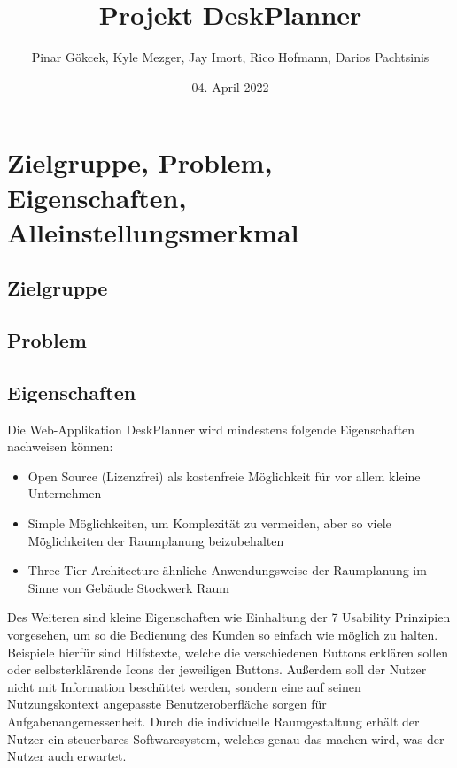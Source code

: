 \documentclass{article}
\title{Projekt DeskPlanner}
\author{Pinar Gökcek, Kyle Mezger, Jay Imort, Rico Hofmann, Darios Pachtsinis}
\date{04. April 2022}
\begin{document}
\begin{titlepage}
    \centering
    \maketitle

    \vfill

\end{titlepage}

\tableofcontents

\pagebreak

\section{Zielgruppe, Problem, Eigenschaften, Alleinstellungsmerkmal}

\subsection{Zielgruppe}

\subsection{Problem}

\subsection{Eigenschaften}
Die Web-Applikation DeskPlanner wird mindestens folgende Eigenschaften nachweisen können:
\begin{itemize}
    \item Open Source (Lizenzfrei) als kostenfreie Möglichkeit für vor allem kleine Unternehmen
    \item Simple Möglichkeiten, um Komplexität zu vermeiden, aber so viele Möglichkeiten der Raumplanung beizubehalten
    \item Three-Tier Architecture ähnliche Anwendungsweise der Raumplanung im Sinne von Gebäude \longrightarrow Stockwerk \longrightarrow Raum 
\end{itemize}
Des Weiteren sind kleine Eigenschaften wie Einhaltung der 7 Usability Prinzipien
vorgesehen, um so die Bedienung des Kunden so einfach wie möglich zu halten. 
Beispiele hierfür sind Hilfstexte, welche die verschiedenen Buttons erklären sollen
oder selbsterklärende Icons der jeweiligen Buttons. Außerdem soll der Nutzer nicht
mit Information beschüttet werden, sondern eine auf seinen Nutzungskontext
angepasste Benutzeroberfläche sorgen für Aufgabenangemessenheit. Durch die 
individuelle Raumgestaltung erhält der Nutzer ein steuerbares Softwaresystem,
welches genau das machen wird, was der Nutzer auch erwartet.
\end{document}
